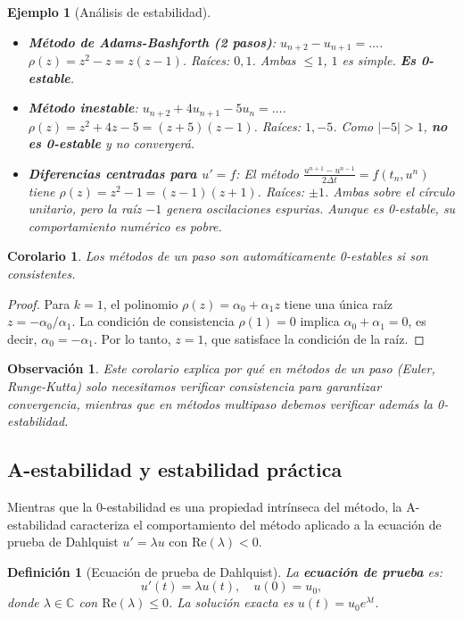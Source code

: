 \documentclass[a4paper,11pt]{report}
\newtheorem{corollary}[theorem]{Corolario}
\newtheorem{definition}[theorem]{Definición}
\newtheorem{example}[theorem]{Ejemplo}
\newtheorem{remark}[theorem]{Observación}
\begin{document}
\begin{example}[Análisis de estabilidad]
\begin{itemize}
    \item \textbf{Método de Adams-Bashforth (2 pasos)}: $u_{n+2} - u_{n+1} = \dots$. $\rho(z) = z^2 - z = z(z-1)$. Raíces: $0, 1$. Ambas $\leq 1$, $1$ es simple. \textbf{Es 0-estable}.
    \item \textbf{Método inestable}: $u_{n+2} + 4u_{n+1} - 5u_n = \dots$. $\rho(z) = z^2 + 4z - 5 = (z+5)(z-1)$. Raíces: $1, -5$. Como $|-5| > 1$, \textbf{no es 0-estable} y no convergerá.
    \item \textbf{Diferencias centradas para $u' = f$}: El método $\frac{u^{n+1} - u^{n-1}}{2\Delta t} = f(t_n, u^n)$ tiene $\rho(z) = z^2 - 1 = (z-1)(z+1)$. Raíces: $\pm 1$. Ambas sobre el círculo unitario, pero la raíz $-1$ genera oscilaciones espurias. Aunque es 0-estable, su comportamiento numérico es pobre.
\end{itemize}
\end{example}

\begin{corollary}
Los métodos de un paso son automáticamente 0-estables si son consistentes.
\end{corollary}
\begin{proof}
Para $k=1$, el polinomio $\rho(z) = \alpha_0 + \alpha_1 z$ tiene una única raíz $z = -\alpha_0/\alpha_1$. La condición de consistencia $\rho(1) = 0$ implica $\alpha_0 + \alpha_1 = 0$, es decir, $\alpha_0 = -\alpha_1$. Por lo tanto, $z = 1$, que satisface la condición de la raíz.
\end{proof}

\begin{remark}
Este corolario explica por qué en métodos de un paso (Euler, Runge-Kutta) solo necesitamos verificar consistencia para garantizar convergencia, mientras que en métodos multipaso debemos verificar además la 0-estabilidad.
\end{remark}

\subsection{A-estabilidad y estabilidad práctica}

Mientras que la 0-estabilidad es una propiedad intrínseca del método, la A-estabilidad caracteriza el comportamiento del método aplicado a la ecuación de prueba de Dahlquist $u' = \lambda u$ con $\text{Re}(\lambda) < 0$.

\begin{definition}[Ecuación de prueba de Dahlquist]
La \textbf{ecuación de prueba} es:
\[
u'(t) = \lambda u(t), \quad u(0) = u_0,
\]
donde $\lambda \in \mathbb{C}$ con $\text{Re}(\lambda) \leq 0$. La solución exacta es $u(t) = u_0 e^{\lambda t}$.
\end{definition}
\end{document}
